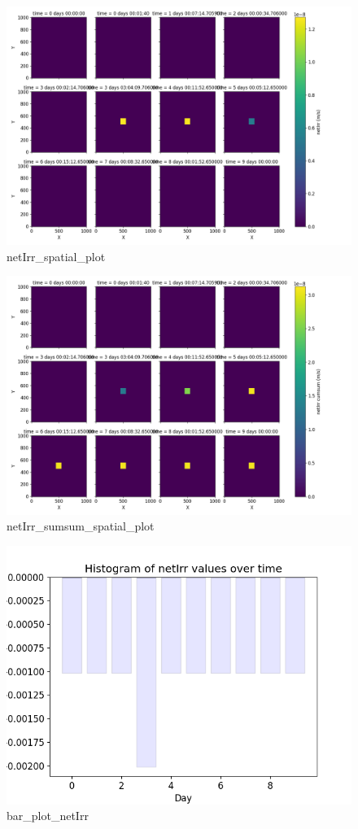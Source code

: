 \documentclass{article}
\begin{document}
\begin{figure}[!htbp]
\centering
\includegraphics[width=0.875\linewidth]{files/netIrr_spatial_plot-3857eeb2205a5eeb9704563034b18cc5.png}
\caption*{netIrr\_spatial\_plot}
\end{figure}

\begin{figure}[!htbp]
\centering
\includegraphics[width=0.875\linewidth]{files/netIrr_sumsum_spatia-d10967037bea75e5f728f0e00ebb3be5.png}
\caption*{netIrr\_sumsum\_spatial\_plot}
\end{figure}

\begin{figure}[!htbp]
\centering
\includegraphics[width=0.875\linewidth]{files/bar_plot_netIrr-15bd447790e95df3852d4fed300027e3.png}
\caption*{bar\_plot\_netIrr}
\end{figure}
\end{document}
